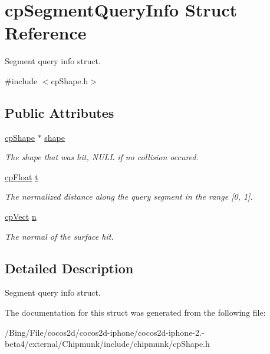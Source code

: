\hypertarget{structcp_segment_query_info}{\section{cp\-Segment\-Query\-Info Struct Reference}
\label{structcp_segment_query_info}
}


Segment query info struct.  




{\ttfamily \#include $<$cp\-Shape.\-h$>$}

\subsection*{Public Attributes}
\begin{DoxyCompactItemize}
\item 
\hypertarget{structcp_segment_query_info_af848e68253c55654fdff7d0c5cb85a9a}{\hyperlink{structcp_shape}{cp\-Shape} $\ast$ \hyperlink{structcp_segment_query_info_af848e68253c55654fdff7d0c5cb85a9a}{shape}}\label{structcp_segment_query_info_af848e68253c55654fdff7d0c5cb85a9a}

\begin{DoxyCompactList}\small\item\em The shape that was hit, N\-U\-L\-L if no collision occured. \end{DoxyCompactList}\item 
\hypertarget{structcp_segment_query_info_a479edbf2533d91dee485394622178cb6}{\hyperlink{group__basic_types_gac1ed65573e035bf892505768c852d8d3}{cp\-Float} \hyperlink{structcp_segment_query_info_a479edbf2533d91dee485394622178cb6}{t}}\label{structcp_segment_query_info_a479edbf2533d91dee485394622178cb6}

\begin{DoxyCompactList}\small\item\em The normalized distance along the query segment in the range \mbox{[}0, 1\mbox{]}. \end{DoxyCompactList}\item 
\hypertarget{structcp_segment_query_info_aba38c84152c1107917bb83085375ee08}{\hyperlink{structcp_vect}{cp\-Vect} \hyperlink{structcp_segment_query_info_aba38c84152c1107917bb83085375ee08}{n}}\label{structcp_segment_query_info_aba38c84152c1107917bb83085375ee08}

\begin{DoxyCompactList}\small\item\em The normal of the surface hit. \end{DoxyCompactList}\end{DoxyCompactItemize}


\subsection{Detailed Description}
Segment query info struct. 

The documentation for this struct was generated from the following file\-:\begin{DoxyCompactItemize}
\item 
/\-Bing/\-File/cocos2d/cocos2d-\/iphone/cocos2d-\/iphone-\/2.-\/beta4/external/\-Chipmunk/include/chipmunk/cp\-Shape.\-h\end{DoxyCompactItemize}
